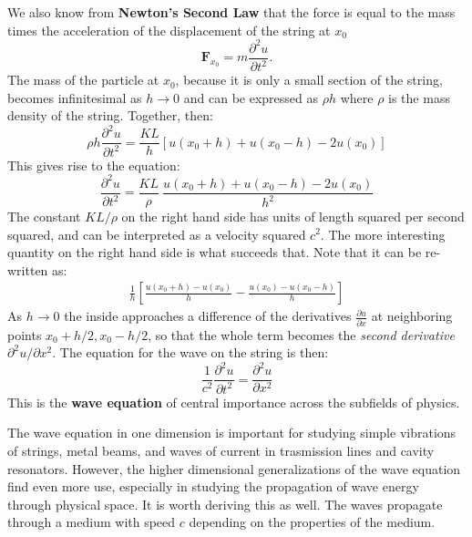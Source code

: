 \documentclass[../master.tex]{subfiles}
\begin{document}
	We also know from \textbf{Newton's Second Law} that the force is equal to the mass times the acceleration of the displacement of the string at $x_0$
	\begin{equation}
		\mathbf F_{x_0} = m \frac{\partial^2 u}{\partial t^2}.
	\end{equation}
	The mass of the particle at $x_0$, because it is only a small section of the string, becomes infinitesimal as $h \rightarrow 0$ and can be expressed as $\rho h$ where $\rho$ is the mass density of the string. Together, then:
	\begin{equation}
		\rho h \frac{\partial^2 u}{\partial t^2} = \frac{KL}{h} [u(x_0 + h) + u(x_0 - h) - 2 u(x_0)]
	\end{equation}
	This gives rise to the equation:
	\begin{equation}
		\frac{\partial^2 u}{\partial t^2} = \frac{KL}{\rho} ~ \frac{u(x_0 + h) + u(x_0 - h) - 2 u(x_0)}{h^2}
	\end{equation}
	The constant $KL/\rho$ on the right hand side has units of length squared per second squared, and can be interpreted as a velocity squared $c^2$. The more interesting quantity on the right hand side is what succeeds that. Note that it can be re-written as:
	\begin{align*}
		\frac{1}{h} \left[\frac{u(x_0 + h) - u(x_0)}{h}  - \frac{u(x_0) - u(x_0 - h)}{h}\right]
	\end{align*}
	As $h \rightarrow 0$ the inside approaches a difference of the derivatives $\frac{\partial u}{\partial x}$ at neighboring points $x_0 + h/2, x_0 - h/2$, so that the whole term becomes the \emph{second derivative} $\partial^2 u/\partial x^2$. The equation for the wave on the string is then:
	\begin{equation}
		\frac{1}{c^2} \frac{\partial^2 u}{\partial t^2} = \frac{\partial^2 u}{\partial x^2}
	\end{equation}
	This is the \textbf{wave equation} of central importance across the subfields of physics. 
	
	The wave equation in one dimension is important for studying simple vibrations of strings, metal beams, and waves of current in trasmission lines and cavity resonators. However, the higher dimensional generalizations of the wave equation find even more use, especially in studying the propagation of wave energy through physical space. It is worth deriving this as well. The waves propagate through a medium with speed $c$ depending on the properties of the medium. 
	
\end{document}
